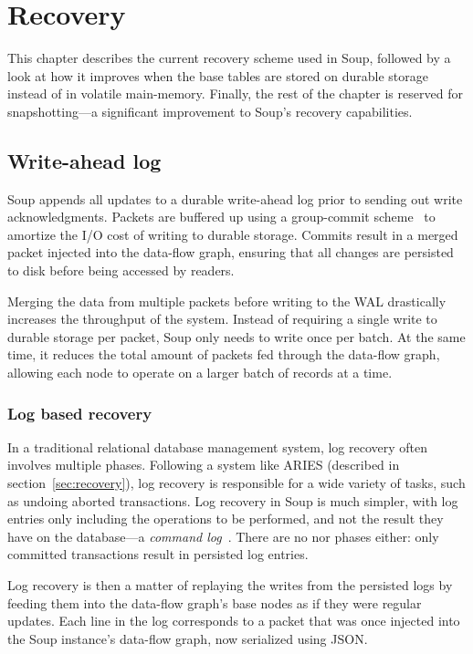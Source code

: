 \chapter{Recovery}\label{chap:recovery}

This chapter describes the current recovery scheme used in Soup, followed by a
look at how it improves when the base tables are stored on durable storage
instead of in volatile main-memory. Finally, the rest of the chapter is reserved
for snapshotting---a significant improvement to Soup's recovery capabilities.

\newpage

\section{Write-ahead log}

Soup appends all updates to a durable write-ahead log prior to sending out write
acknowledgments. Packets are buffered up using a group-commit
scheme~\cite{main-memory} to amortize the I/O cost of writing to durable
storage. Commits result in a merged packet injected into the data-flow graph,
ensuring that all changes are persisted to disk before being accessed by
readers.

Merging the data from multiple packets before writing to the WAL drastically
increases the throughput of the system. Instead of requiring a single write to
durable storage per packet, Soup only needs to write once per batch. At the same
time, it reduces the total amount of packets fed through the data-flow graph,
allowing each node to operate on a larger batch of records at a time.

\subsection{Log based recovery}\label{sec:log-recovery}

In a traditional relational database management system, log recovery often
involves multiple phases. Following a system like ARIES (described in
section~\ref{sec:recovery}), log recovery is responsible for a wide variety of
tasks, such as undoing aborted transactions. Log recovery in Soup is much
simpler, with log entries only including the operations to be performed, and not
the result they have on the database---a \textit{command
log}~\cite{voltdb-recovery}. There are no  nor  phases
either: only committed transactions result in persisted log entries.

Log recovery is then a matter of replaying the writes from the persisted logs by
feeding them into the data-flow graph's base nodes as if they were regular
updates. Each line in the log corresponds to a packet that was once injected
into the Soup instance's data-flow graph, now serialized using JSON.\@

